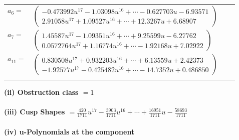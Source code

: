 \documentclass[1p]{elsarticle_modified}
\theoremstyle{definition}
\begin{document}
\begin{tabular}{m{7pt} m{180pt} m{7pt} m{180pt} }
\flushright $a_{6}=$&$\begin{pmatrix}-0.473992 u^{17}-1.03098 u^{16}+\cdots-0.627703 u-6.93571\\2.91058 u^{17}+1.09527 u^{16}+\cdots+12.3267 u+6.68907\end{pmatrix}$ \\
\flushright $a_{7}=$&$\begin{pmatrix}1.45587 u^{17}-1.09351 u^{16}+\cdots+9.25599 u-6.27762\\0.0572764 u^{17}+1.16774 u^{16}+\cdots-1.92168 u+7.02922\end{pmatrix}$ \\
\flushright $a_{11}=$&$\begin{pmatrix}0.830508 u^{17}+0.932203 u^{16}+\cdots+6.13559 u+2.42373\\-1.92577 u^{17}-0.425482 u^{16}+\cdots-14.7352 u+0.486850\end{pmatrix}$\\&\end{tabular}
\flushleft \textbf{(ii) Obstruction class $= 1$}\\~\\
\flushleft \textbf{(iii) Cusp Shapes $= \frac{420}{1711} u^{17}-\frac{3903}{1711} u^{16}+\cdots+\frac{16951}{1711} u-\frac{58693}{1711}$}\\~\\
\newpage\renewcommand{\arraystretch}{1}
\flushleft \textbf{(iv) u-Polynomials at the component}\newline \\
\end{document}
